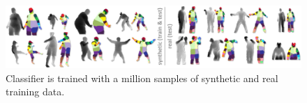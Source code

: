 \begin{figure}
	[h] \hspace{-5 mm} 
	\includegraphics[width=160mm]{figures/content/ni-train.jpg} \caption{Classifier is trained with a million samples of synthetic and real training data. \cite{13} } \label{fg:ni:train} 
\end{figure}
